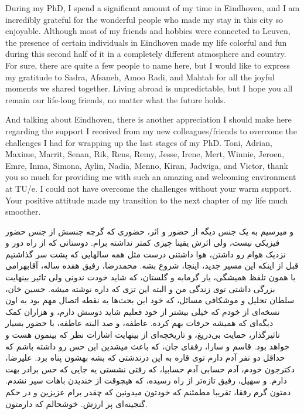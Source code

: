 During my PhD, I spend a significant amount of my time in Eindhoven, and I am incredibly grateful for the wonderful people who made my stay in this city so enjoyable. Although most of my friends and hobbies were connected to Leuven, the presence of certain individuals in Eindhoven made my life colorful and fun during this second half of it in a completely different atmosphere and country. For sure, there are quite a few people to name here, but I would like to express my gratitude to Sadra, Afsaneh, Amoo Radi, and Mahtab for all the joyful moments we shared together. Living abroad is unpredictable, but I hope you all remain our life-long friends, no matter what the future holds.

And talking about Eindhoven, there is another appreciation I should make here regarding the support I received from my new colleagues/friends to overcome the challenges I had for wrapping up the last stages of my PhD. Toni, Adrian, Maxime, Marrit, Senan, Rik, Rens, Remy, Jesse, Irene, Mert, Winnie, Jeroen, Emre, Inma, Simona, Aylin, Nadia, Menno, Kiran, Jadwiga, and Victor, thank you so much for providing me with such an amazing and welcoming environment at TU/e. I could not have overcome the challenges without your warm support. Your positive attitude made my transition to the next chapter of my life much smoother. 

\begin{flushright}
\foreignlanguage{persian}
{
و میرسیم به یک جنس دیگه از حضور و اثر، حضوری که گرچه جنسش از جنس حضور فیزیکی نیست، ولی اثرش یقینا چیزی کمتر نداشته برام. دوستانی که از راه دور و نزدیک هوام رو داشتن، هوا داشتنی درست مثل همه سالهایی که پشت سر گذاشتیم قبل از اینکه این مسیر جدید، اینجا، شروع بشه. محمدرضا، رفیق هفده ساله، آقابهرامی با همون تلفظ همیشگی، یار گرمابه و گلستان، که شاید خودت ندونی ولی تاثیر بینهایت بزرگی داشتی توی زندگی من و البته این تزی که داره نوشته میشه. حسین خان، سلطان تحلیل و موشکافی مسائل، که خود این بحث‌ها یه نقطه اتصال مهم بود به اون نسخه‌ای از خودم که خیلی بیشتر از خود فعلیم شاید دوسش دارم، و هزاران کمک دیگه‌ای که همیشه حرفات بهم کرده. عاطفه، و صد البته عاطفه، با حضور بسیار تاثیرگذار، حمایت بی‌دریغ، و تاریخچه‌ای از بینهایت اشارات نظر که بینمون هست و خواهد بود. قاسم و سارا، رفقای جان، که باعث میشدین این حس رو داشته باشم که حداقل دو نفر آدم دارم توی قاره به این درندشتی که بشه بهشون پناه برد. علیرضا، دکترجون خودم، آدم حسابی آدم حسابیا، که رفتی نشستی یه جایی که حس برادر بهت دارم. و سهیل، رفیق تازه‌تر از راه رسیده، که هیچوقت از خندیدن باهات سیر نشدم. دمتون گرم رفقا، تقریبا مطمئنم که خودتون میدونین که چقدر برام عزیزین و در حکم گنجینه‌ای پر ارزش. خوشحالم که دارمتون.
}
\end{flushright}


